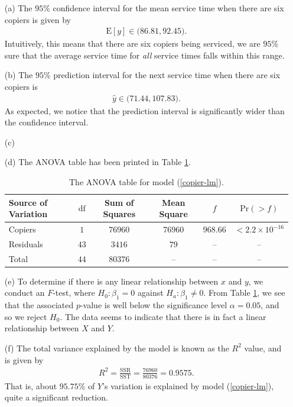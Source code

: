 \documentclass[10pt]{article}
\begin{document}
\begin{itemize}
    \item[(a)] The \(95\%{}\) confidence interval for the mean service time when there are six copiers is given by 
    \begin{align*}
        \mathrm{E}[y] \in \big(86.81, 92.45 \big).
    \end{align*}
    Intuitively, this means that there are six copiers being serviced, we are \(95\%{}\) sure that the average service time for 
    \textsl{all} service times falls within this range. 
    \item[(b)] The \(95\%{}\) prediction interval for the next service time when there are six copiers is 
    \begin{align*}
        \widehat{y} \in \big( 71.44, 107.83 \big).
    \end{align*}
    As expected, we notice that the prediction interval is significantly wider than the confidence interval. 
    \item[(c)] 
    \item[(d)] The ANOVA table has been printed in Table \ref{copier-anova}.
    \begin{table}
        \centering
        \def\arraystretch{1.25}
        \begin{tabular}[ht]{lccccc} \toprule
            Source of Variation & \(\mathrm{df}\) & Sum of Squares & Mean Square & \(f\) & \(\mathrm{Pr}(> f)\) \\\midrule
            Copiers & \(1\) & \(76960\) & \(76960\) & \(968.66\) & \(< 2.2 \times 10^{-16}\) \\
            Residuals & \(43\) & \(3416\) & \(79\) & -- & -- \\
            Total & \(44\) & \(80376\) & -- & -- & -- \\\bottomrule
        \end{tabular}
        \caption{The ANOVA table for model (\ref{copier-lm}).}
        \label{copier-anova}
    \end{table}
    \item[(e)] To determine if there is any linear relationship between \(x\) and \(y\), we conduct an \(F\)-test, where 
    \(H_0 : \beta_1 = 0\) against \(H_a : \beta_1 \neq 0\). From Table \ref{copier-anova}, we see that the associated \(p\)-value is 
    well below the significance level \(\alpha = 0.05\), and so we reject \(H_0\). The data seems to indicate that there is in fact a 
    linear relationship between \(X\) and \(Y\).
    \item[(f)] The total variance explained by the model is known as the \(R^2\) value, and is given by
    \begin{align*}
        R^2 = \frac{\mathrm{SSR}}{\mathrm{SST}} = \frac{76960}{80376} = 0.9575.
    \end{align*}
    That is, about \(95.75\%{}\) of \(Y\)'s variation is explained by model (\ref{copier-lm}), quite a significant reduction. 
\end{itemize}
\end{document}
